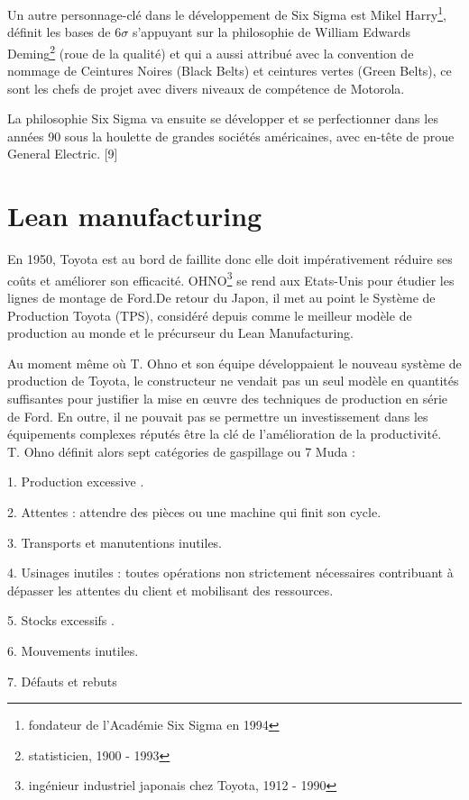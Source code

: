 \documentclass[12pt, a4paper]{thesis}
\begin{document}
Un autre personnage-clé dans le développement de Six Sigma est Mikel Harry\footnote{fondateur de l'Académie Six Sigma en 1994}, définit les bases de $6\sigma$ s’appuyant sur la philosophie de William Edwards Deming\footnote{ statisticien, 1900 - 1993} (roue de la qualité) et qui a aussi attribué avec la convention de nommage de Ceintures Noires (Black Belts) et ceintures vertes (Green Belts), ce sont les chefs de projet avec divers niveaux de compétence de Motorola.

La philosophie Six Sigma va ensuite se développer et se perfectionner dans les années 90 sous la houlette de grandes sociétés américaines, avec en-tête de proue General Electric. [9]




\section{Lean manufacturing}
En 1950, Toyota est au bord de faillite donc elle doit impérativement réduire ses coûts et améliorer son efficacité.  OHNO\footnote{ ingénieur industriel japonais chez Toyota, 1912 - 1990} se rend aux Etats-Unis pour étudier les lignes de montage de Ford.De retour du Japon, il met au point le Système de Production Toyota (TPS), considéré depuis comme le meilleur modèle de production au monde et le précurseur du Lean Manufacturing.


Au moment même où T. Ohno et son équipe développaient le nouveau système de production de Toyota, le constructeur ne vendait pas un seul modèle en quantités suffisantes pour justifier la mise en œuvre des techniques de production en série de Ford. En outre, il ne pouvait pas se permettre un investissement dans les équipements complexes réputés être la clé de l’amélioration de la productivité. \\ 

T. Ohno définit alors sept catégories de gaspillage ou 7 Muda :
\item 1. Production excessive .
\item 2. Attentes : attendre des pièces ou une machine qui finit son cycle.
\item 3. Transports et manutentions inutiles.
\item 4. Usinages inutiles : toutes opérations non strictement nécessaires contribuant à dépasser les attentes du client et mobilisant des ressources.
\item5. Stocks excessifs .
\item 6. Mouvements inutiles.
\item 7. Défauts et rebuts\\
\end{document}
